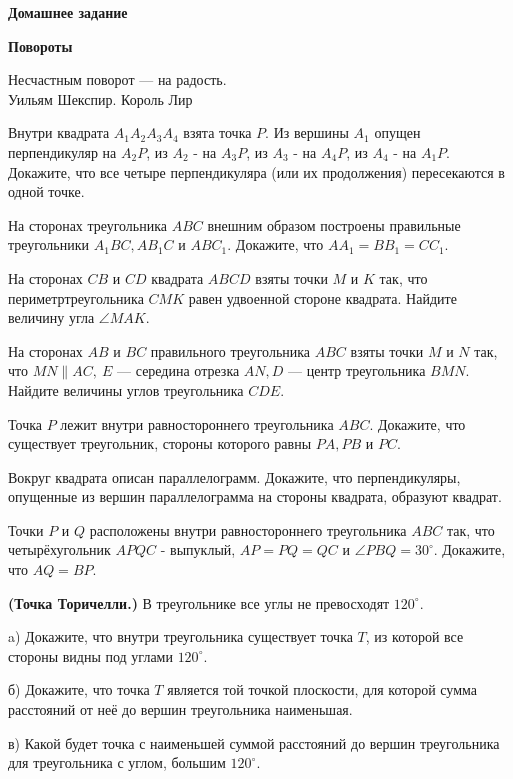 \centerline{\bf \Huge Домашнее задание}
\centerline{\bf \Huge Повороты}

\begin{flushright}
        \scriptsize{Несчастным поворот — на радость.\\ Уильям Шекспир. Король Лир}
\end{flushright}

Внутри квадрата $A_1 A_2 A_3 A_4$ взята точка $P$. Из вершины $A_1$ опущен перпендикуляр на $A_2 P$, из $A_2$ - на $A_3 P$, из $A_3$ - на $A_4 P$, из $A_4$ - на $A_1 P$. Докажите, что все четыре перпендикуляра (или их продолжения) пересекаются в одной точке.

На сторонах треугольника $A B C$ внешним образом построены правильные треугольники $A_1 B C, A B_1 C$ и $A B C_1$. Докажите, что $A A_1=B B_1=C C_1$.

 На сторонах $C B$ и $C D$ квадрата $A B C D$ взяты точки $M$ и $K$ так, что периметртреугольника $C M K$ равен удвоенной стороне квадрата. Найдите величину угла $\angle MAK$.

На сторонах $A B$ и $B C$ правильного треугольника $A B C$ взяты точки $M$ и $N$ так, что $M N \| A C,\  E$ --- середина отрезка $A N, D$ --- центр треугольника $B M N$. Найдите величины углов треугольника $C D E$.

Точка $P$ лежит внутри равностороннего треугольника $A B C$. Докажите, что существует треугольник, стороны которого равны $P A, P B$ и $P C$.

Вокруг квадрата описан параллелограмм. Докажите, что перпендикуляры, опущенные из вершин параллелограмма на стороны квадрата, образуют квадрат.

Точки $P$ и $Q$ расположены внутри равностороннего треугольника $A B C$ так, что четырёхугольник $A P Q C$ - выпуклый, $A P=P Q=Q C$ и $\angle P B Q=30^{\circ}$. Докажите, что $A Q=B P$.

\textbf{(Точка Торичелли.)} В треугольнике все углы не превосходят $120^{\circ}$.

a) Докажите, что внутри треугольника существует точка $T$, из которой все стороны видны под углами $120^{\circ}$.

б) Докажите, что точка $T$ является той точкой плоскости, для которой сумма расстояний от неё до вершин треугольника наименьшая.

в) Какой будет точка с наименьшей суммой расстояний до вершин треугольника для треугольника с углом, большим $120^{\circ}$.